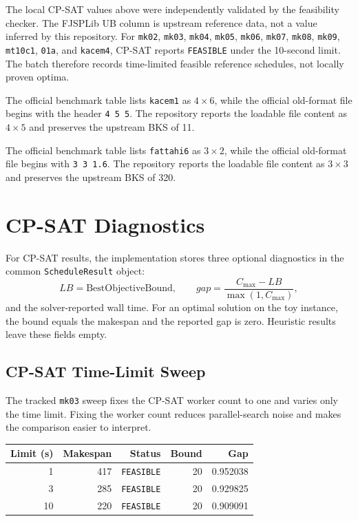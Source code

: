 ﻿\documentclass[11pt]{article}
\begin{document}
The local CP-SAT values above were independently validated by the feasibility
checker. The FJSPLib UB column is upstream reference data, not a value inferred
by this repository. For \texttt{mk02}, \texttt{mk03}, \texttt{mk04},
\texttt{mk05}, \texttt{mk06}, \texttt{mk07}, \texttt{mk08}, \texttt{mk09},
\texttt{mt10c1}, \texttt{01a}, and \texttt{kacem4}, CP-SAT reports
\texttt{FEASIBLE} under the 10-second limit. The batch therefore records
time-limited feasible reference schedules, not locally proven optima.

The official benchmark table lists \texttt{kacem1} as $4 \times 6$, while the
official old-format file begins with the header \texttt{4 5 5}. The repository
reports the loadable file content as $4 \times 5$ and preserves the upstream
BKS of 11.

The official benchmark table lists \texttt{fattahi6} as $3 \times 2$, while the
official old-format file begins with \texttt{3 3 1.6}. The repository reports
the loadable file content as $3 \times 3$ and preserves the upstream BKS of 320.

\section{CP-SAT Diagnostics}

For CP-SAT results, the implementation stores three optional diagnostics in
the common \texttt{ScheduleResult} object:
\[
LB = \text{BestObjectiveBound},
\qquad
gap = \frac{C_{\max}-LB}{\max(1,C_{\max})},
\]
and the solver-reported wall time. For an optimal solution on the toy instance,
the bound equals the makespan and the reported gap is zero. Heuristic results
leave these fields empty.

\subsection{CP-SAT Time-Limit Sweep}

The tracked \texttt{mk03} sweep fixes the CP-SAT worker count to one and varies
only the time limit. Fixing the worker count reduces parallel-search noise and
makes the comparison easier to interpret.

\begin{table}[h]
\centering
\begin{tabular}{rrrrr}
\toprule
Limit (s) & Makespan & Status & Bound & Gap \\
\midrule
1 & 417 & \texttt{FEASIBLE} & 20 & 0.952038 \\
3 & 285 & \texttt{FEASIBLE} & 20 & 0.929825 \\
10 & 220 & \texttt{FEASIBLE} & 20 & 0.909091 \\
\bottomrule
\end{tabular}
\end{table}
\end{document}
